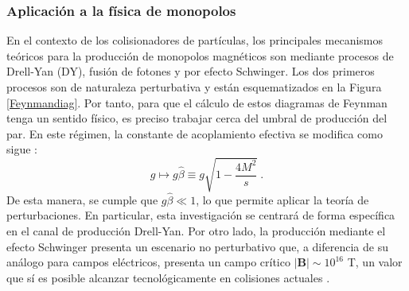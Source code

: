 \documentclass[12pt, a4paper]{article}
\begin{document}
\subsubsection{Aplicación a la física de monopolos}
En el contexto de los colisionadores de partículas, los principales mecanismos teóricos para la producción de monopolos magnéticos son mediante procesos de Drell-Yan (DY), fusión de fotones y por efecto Schwinger. Los dos primeros procesos son de naturaleza perturbativa y están esquematizados en la Figura \ref{Feynmandiag}. Por tanto, para que el cálculo de estos diagramas de Feynman tenga un sentido físico, es preciso trabajar cerca del umbral de producción del par. En este régimen, la constante de acoplamiento efectiva se modifica como sigue \cite{Baines2018}:
\begin{equation}\label{gbeta}
    g\mapsto g\hat\beta\equiv g\sqrt{1-\frac{4M^2}{s}}\ .
\end{equation}
De esta manera, se cumple que $g\hat{\beta} \ll 1$, lo que permite aplicar la teoría de perturbaciones. En particular, esta investigación se centrará de forma específica en el canal de producción Drell-Yan. Por otro lado, la producción mediante el efecto Schwinger presenta un escenario no perturbativo que, a diferencia de su análogo para campos eléctricos, presenta un campo crítico $|\boldsymbol B| \sim 10^{16}$ T, un valor que sí es posible alcanzar tecnológicamente en colisiones actuales \cite{MoEDAL2022}.
\end{document}

